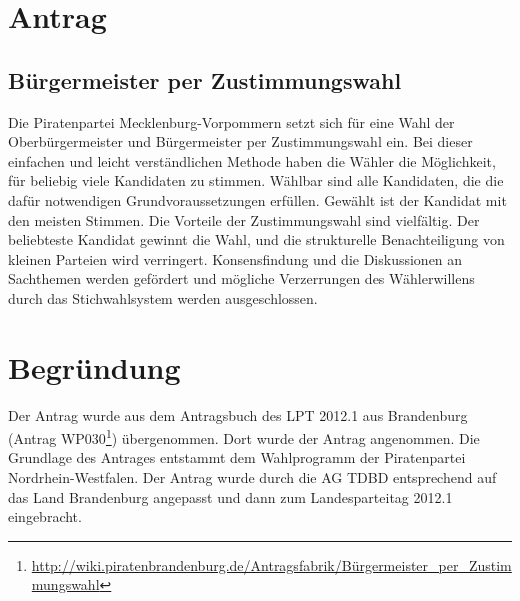 \section{Antrag}

\subsection{Bürgermeister per Zustimmungswahl}

Die Piratenpartei Mecklenburg-Vorpommern setzt sich für eine Wahl der Oberbürgermeister und Bürgermeister per Zustimmungswahl ein. Bei dieser einfachen und leicht verständlichen Methode haben die Wähler die Möglichkeit, für beliebig viele Kandidaten zu stimmen. Wählbar sind alle Kandidaten, die die dafür notwendigen Grundvoraussetzungen erfüllen. Gewählt ist der Kandidat mit den meisten Stimmen. Die Vorteile der Zustimmungswahl sind vielfältig. Der beliebteste Kandidat gewinnt die Wahl, und die strukturelle Benachteiligung von kleinen Parteien wird verringert. Konsensfindung und die Diskussionen an Sachthemen werden gefördert und mögliche Verzerrungen des Wählerwillens durch das Stichwahlsystem werden ausgeschlossen.

\section{Begründung}

Der Antrag wurde aus dem Antragsbuch des LPT 2012.1 aus Brandenburg (Antrag WP030\footnote{\url{http://wiki.piratenbrandenburg.de/Antragsfabrik/Bürgermeister\_per\_Zustimmungswahl}}) übergenommen. Dort wurde der Antrag angenommen. Die Grundlage des Antrages entstammt dem Wahlprogramm der Piratenpartei Nordrhein-Westfalen. Der Antrag wurde durch die AG TDBD entsprechend auf das Land Brandenburg angepasst und dann zum Landesparteitag 2012.1 eingebracht.
